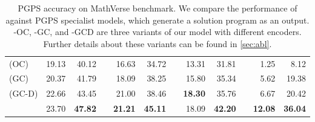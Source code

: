 \begin{table*}[t!]
{\begin{tabular}{l rr c rr c rr c rr }
        \midrule
        \geovlm{} (OC) & 19.13 & 40.12 && 16.63 & 34.72 && 13.31 & 31.81 && 1.25 & 8.12 \\ 
        \geovlm{} (GC) & 20.37 & 41.79 && 18.09 & 38.25 && 15.80 & 35.34 && 5.62 & 19.38 \\
        \geovlm{} (GC-D) & 22.66 & 43.45 && 21.00 & 38.46 && \textbf{18.30} & 35.76 && 6.67 & 20.42 \\
        \geovlm{} & 23.70 & \textbf{47.82} && \textbf{21.21} & \textbf{45.11} && 18.09 & \textbf{42.20} && \textbf{12.08} & \textbf{36.04} \\
        \bottomrule
    \end{tabular}
    }
    \caption{PGPS accuracy on MathVerse benchmark. We compare the performance of \geovlm{} against PGPS specialist models, which generate a solution program as an output. \geovlm{}-OC, -GC, and -GCD are three variants of our model with different encoders. Further details about these variants can be found in \cref{sec:abl}.}
    \label{tab:mathverse}
    \vskip -0.1in
\end{table*}